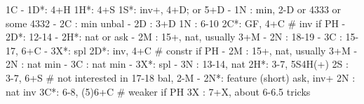 1C - 
1D*: 4+H
1H*: 4+S
1S*: inv+, 4+D; or 5+D
   - 1N : min, 2-D or 4333 or some 4332
   - 2C : min unbal
   - 2D : 3+D
1N : 6-10
2C*: GF, 4+C  # inv if PH
   - 2D*: 12-14
		- 2H*: nat or ask
   - 2M : 15+, nat, usually 3+M
   - 2N : 18-19
   - 3C : 15-17, 6+C
   - 3X*: spl
2D*: inv, 4+C  # constr if PH
   - 2M : 15+, nat, usually 3+M
   - 2N : nat min
   - 3C : nat min
   - 3X*: spl
   - 3N : 13-14, nat
2H*: 3-7, 5S4H(+)
2S : 3-7, 6+S  # not interested in 17-18 bal, 2-M
   - 2N*: feature (short) ask, inv+
2N : nat inv
3C*: 6-8, (5)6+C  # weaker if PH
3X : 7+X, about 6-6.5 tricks
